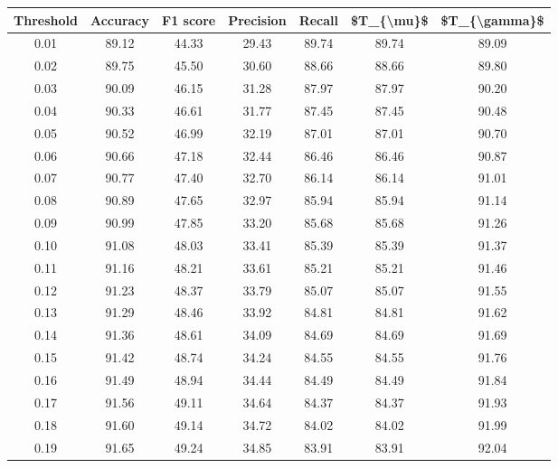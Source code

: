 \begin{tabular}{|c|c|c|c|c|c|c|}
\hline
 Threshold &  Accuracy &  F1 score &  Precision &  Recall &  \$T\_\{\textbackslash mu\}\$ &  \$T\_\{\textbackslash gamma\}\$ \\
\hline
      0.01 &     89.12 &     44.33 &      29.43 &   89.74 &      89.74 &         89.09 \\
      0.02 &     89.75 &     45.50 &      30.60 &   88.66 &      88.66 &         89.80 \\
      0.03 &     90.09 &     46.15 &      31.28 &   87.97 &      87.97 &         90.20 \\
      0.04 &     90.33 &     46.61 &      31.77 &   87.45 &      87.45 &         90.48 \\
      0.05 &     90.52 &     46.99 &      32.19 &   87.01 &      87.01 &         90.70 \\
      0.06 &     90.66 &     47.18 &      32.44 &   86.46 &      86.46 &         90.87 \\
      0.07 &     90.77 &     47.40 &      32.70 &   86.14 &      86.14 &         91.01 \\
      0.08 &     90.89 &     47.65 &      32.97 &   85.94 &      85.94 &         91.14 \\
      0.09 &     90.99 &     47.85 &      33.20 &   85.68 &      85.68 &         91.26 \\
      0.10 &     91.08 &     48.03 &      33.41 &   85.39 &      85.39 &         91.37 \\
      0.11 &     91.16 &     48.21 &      33.61 &   85.21 &      85.21 &         91.46 \\
      0.12 &     91.23 &     48.37 &      33.79 &   85.07 &      85.07 &         91.55 \\
      0.13 &     91.29 &     48.46 &      33.92 &   84.81 &      84.81 &         91.62 \\
      0.14 &     91.36 &     48.61 &      34.09 &   84.69 &      84.69 &         91.69 \\
      0.15 &     91.42 &     48.74 &      34.24 &   84.55 &      84.55 &         91.76 \\
      0.16 &     91.49 &     48.94 &      34.44 &   84.49 &      84.49 &         91.84 \\
      0.17 &     91.56 &     49.11 &      34.64 &   84.37 &      84.37 &         91.93 \\
      0.18 &     91.60 &     49.14 &      34.72 &   84.02 &      84.02 &         91.99 \\
      0.19 &     91.65 &     49.24 &      34.85 &   83.91 &      83.91 &         92.04 \\

\end{tabular}

